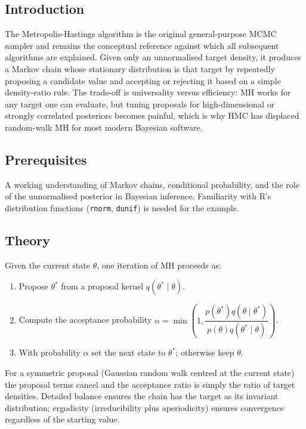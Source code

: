 \documentclass[
]{article}
\author{}
\date{\vspace{-2.5em}}
\providecommand{\tightlist}{%
  \setlength{\itemsep}{0pt}\setlength{\parskip}{0pt}}
\begin{document}
\subsection{Introduction}\label{introduction}

The Metropolis-Hastings algorithm is the original general-purpose MCMC
sampler and remains the conceptual reference against which all
subsequent algorithms are explained. Given only an unnormalised target
density, it produces a Markov chain whose stationary distribution is
that target by repeatedly proposing a candidate value and accepting or
rejecting it based on a simple density-ratio rule. The trade-off is
universality versus efficiency: MH works for any target one can
evaluate, but tuning proposals for high-dimensional or strongly
correlated posteriors becomes painful, which is why HMC has displaced
random-walk MH for most modern Bayesian software.

\subsection{Prerequisites}\label{prerequisites}

A working understanding of Markov chains, conditional probability, and
the role of the unnormalised posterior in Bayesian inference.
Familiarity with R's distribution functions (\texttt{rnorm},
\texttt{dunif}) is needed for the example.

\subsection{Theory}\label{theory}

Given the current state \(\theta\), one iteration of MH proceeds as:

\begin{enumerate}
\def\labelenumi{\arabic{enumi}.}
\tightlist
\item
  Propose \(\theta^*\) from a proposal kernel
  \(q(\theta^* \mid \theta)\).
\item
  Compute the acceptance probability
  \(\alpha = \min\!\left(1, \dfrac{p(\theta^*) q(\theta \mid \theta^*)}{p(\theta) q(\theta^* \mid \theta)}\right)\).
\item
  With probability \(\alpha\) set the next state to \(\theta^*\);
  otherwise keep \(\theta\).
\end{enumerate}

For a symmetric proposal (Gaussian random walk centred at the current
state) the proposal terms cancel and the acceptance ratio is simply the
ratio of target densities. Detailed balance ensures the chain has the
target as its invariant distribution; ergodicity (irreducibility plus
aperiodicity) ensures convergence regardless of the starting value.
\end{document}

